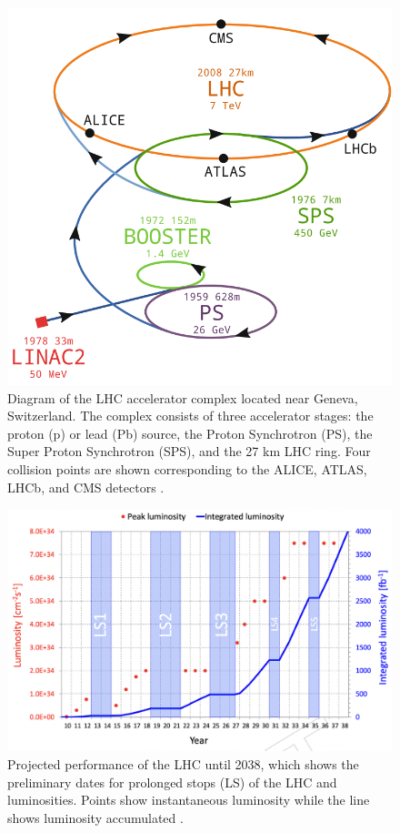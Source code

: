 \documentclass[final,12p]{article}
\begin{document}
 
\begin{figure}[H]
  \centering
  \includegraphics[width=0.6\columnwidth]{./LHCcomplex.png}
  \caption{
    Diagram of the LHC accelerator complex located near Geneva, Switzerland. The complex consists of three accelerator stages: the proton (p) or lead (Pb) source, the Proton Synchrotron (PS), the Super Proton Synchrotron (SPS), and the 27 km LHC ring. Four collision points are shown corresponding to the ALICE, ATLAS, LHCb, and CMS detectors  \cite{Mobs:2684277}.
  }
  \label{figure2}
\end{figure}


\begin{figure}[H]
  \centering
  \includegraphics[width=0.8\columnwidth]{./HLLHCLumi.png}
  \caption{
    Projected performance of the LHC until 2038, which shows the preliminary dates for prolonged stops (LS) of the LHC and luminosities. Points show instantaneous luminosity while the line shows luminosity accumulated \cite{collaborations2019report}.
  }
  \label{figure6}
\end{figure}
\end{document}
